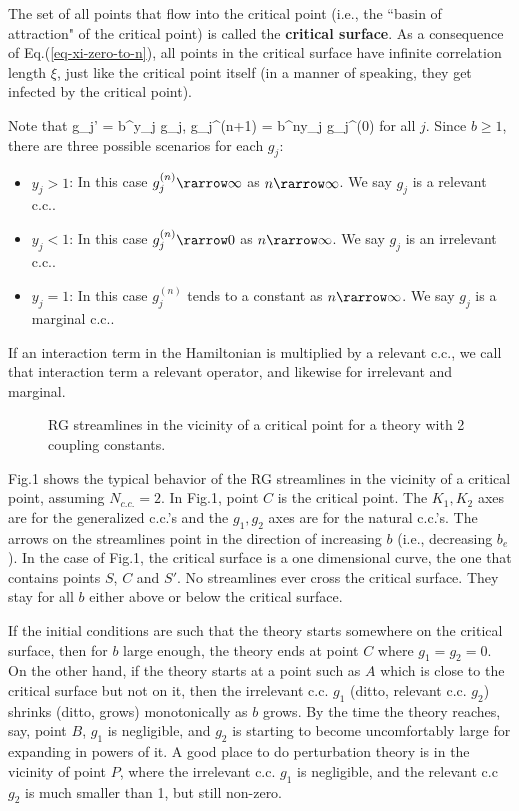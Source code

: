 \documentclass[12pt]{article}
\begin{document}
The set of all points that flow into
 the critical point (i.e., the ``basin
of attraction" of the critical point)
is called the \textbf{critical surface}.
As a consequence
of Eq.(\ref{eq-xi-zero-to-n}),
all points in the critical surface
have infinite correlation length $\xi$,
just like the critical point
itself (in
a manner of speaking, they get
infected by the critical point).


Note that
\beq
g_j' = b^{y_j} g_j,
\;\;
g_j^{(n+1)} = b^{ny_j} g_j^{(0)}
\;
\eeq
for all $j$. Since $b\geq 1$, there
are three possible scenarios for each
$g_j$:
\begin{itemize}
\item $y_j>1$:
In this case
$g_j^{(n)}\rarrow \infty$
as $n\rarrow \infty$. We say
$g_j$ is a relevant c.c..

\item $y_j<1$:
In this case $g_j^{(n)}\rarrow 0$
as $n\rarrow \infty$. We say
$g_j$ is an irrelevant c.c..
\item $y_j=1$:
In this case $g_j^{(n)}$ tends to a constant
as $n\rarrow \infty$. We say
$g_j$ is a marginal c.c..
\end{itemize}
If an  interaction term in the
Hamiltonian is multiplied by a relevant c.c.,
we call that interaction term a relevant
operator, and likewise for irrelevant and marginal.

\begin{figure}[h]
    \begin{center}
    \caption{RG streamlines in
    the vicinity of a critical point
    for a theory with 2 coupling constants.}
    \label{fig-cp}
    \end{center}
\end{figure}

Fig.1 shows the typical behavior
of the RG streamlines in the vicinity
of a critical point, assuming $N_{c.c.}=2$.
In Fig.1, point $C$
is the critical point.
The $K_1,K_2$ axes are for the generalized
c.c.'s and the $g_1, g_2$
axes are for the natural c.c.'s.
The arrows on the streamlines point
in the direction of
increasing $b$ (i.e., decreasing $b_e$).
In the case of Fig.1,
the critical surface
is a
one dimensional curve, the one that contains
points
$S$, $C$ and $S'$.
No streamlines ever cross the
critical surface. They stay for all $b$
either above or below the critical surface.

If the initial conditions
are such that the theory starts
somewhere on the critical surface,
then for $b$ large enough,
the theory ends at point $C$ where
$g_1=g_2=0$. On the
other hand, if the theory
starts at a point such as $A$
which is close
to the critical surface but not on it,
then the irrelevant c.c. $g_1$ (ditto,
relevant c.c. $g_2$)
shrinks (ditto, grows)
monotonically
as $b$ grows.
By the time the theory reaches, say,
point $B$,
$g_1$ is negligible,
and
$g_2$ is starting to become uncomfortably
large for expanding in powers of it.
A good place to do
 perturbation
theory
is in the vicinity of point $P$,
where the irrelevant c.c. $g_1$
is negligible, and the relevant c.c $g_2$
is much smaller than 1, but still non-zero.
\end{document}
